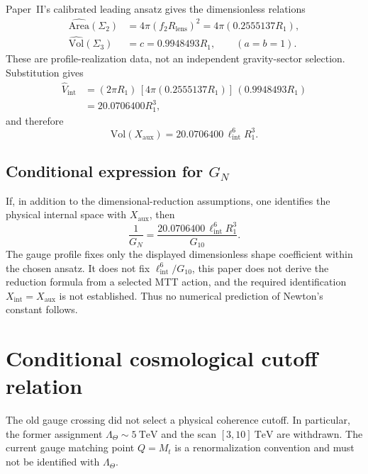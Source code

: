 \documentclass[11pt]{article}
\begin{document}
Paper~II's calibrated leading ansatz gives the dimensionless relations
\begin{align}
\widehat{\mathrm{Area}}(\Sigma_2)
&=4\pi(f_2R_{\mathrm{lens}})^2
=4\pi(0.2555137R_1),\\
\widehat{\mathrm{Vol}}(\Sigma_3)&=c=0.9948493R_1,
\qquad (a=b=1).
\end{align}
These are profile-realization data, not an independent gravity-sector
selection. Substitution gives
\begin{align}
\widehat V_{\mathrm{int}}
&=(2\pi R_1)\,[4\pi(0.2555137R_1)]\,(0.9948493R_1)\\
&=20.0706400R_1^3,
\end{align}
and therefore
\begin{equation}
\boxed{\mathrm{Vol}(X_{\mathrm{aux}})
=20.0706400\,\ell_{\mathrm{int}}^6R_1^3.}
\label{eq:volume_result}
\end{equation}

\subsection{Conditional expression for $G_N$}

If, in addition to the dimensional-reduction assumptions, one identifies the
physical internal space with $X_{\mathrm{aux}}$, then
\begin{equation}
\boxed{\frac{1}{G_N}
=\frac{20.0706400\,\ell_{\mathrm{int}}^6R_1^3}{G_{10}}.}
\label{eq:GN_theta}
\end{equation}
The gauge profile fixes only the displayed dimensionless shape coefficient
within the chosen ansatz. It does not fix $\ell_{\mathrm{int}}^6/G_{10}$, this
paper does not derive the reduction formula from a selected MTT action, and the
required identification $X_{\mathrm{int}}=X_{\mathrm{aux}}$ is not established.
Thus no numerical prediction of Newton's constant follows.


\section{Conditional cosmological cutoff relation}

The old gauge crossing did not select a physical coherence cutoff. In
particular, the former assignment $\Lambda_\Theta\sim5~\mathrm{TeV}$ and the
scan $[3,10]~\mathrm{TeV}$ are withdrawn. The current gauge matching point
$Q=M_t$ is a renormalization convention and must not be identified with
$\Lambda_\Theta$.
\end{document}
